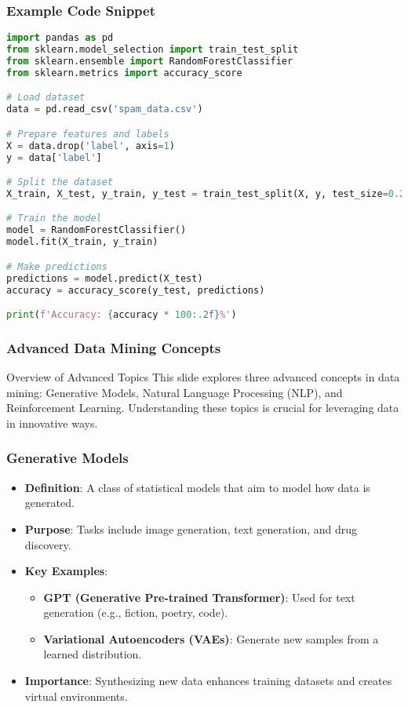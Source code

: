 \documentclass[aspectratio=169]{beamer}
\begin{document}
\begin{frame}[fragile]
    \frametitle{Example Code Snippet}
    \begin{lstlisting}[language=Python]
import pandas as pd
from sklearn.model_selection import train_test_split
from sklearn.ensemble import RandomForestClassifier
from sklearn.metrics import accuracy_score

# Load dataset
data = pd.read_csv('spam_data.csv')

# Prepare features and labels
X = data.drop('label', axis=1)
y = data['label']

# Split the dataset
X_train, X_test, y_train, y_test = train_test_split(X, y, test_size=0.2)

# Train the model
model = RandomForestClassifier()
model.fit(X_train, y_train)

# Make predictions
predictions = model.predict(X_test)
accuracy = accuracy_score(y_test, predictions)

print(f'Accuracy: {accuracy * 100:.2f}%')
    \end{lstlisting}
\end{frame}

\begin{frame}[fragile]
    \frametitle{Advanced Data Mining Concepts}
    \begin{block}{Overview of Advanced Topics}
        This slide explores three advanced concepts in data mining: 
        Generative Models, Natural Language Processing (NLP), and Reinforcement Learning.
        Understanding these topics is crucial for leveraging data in innovative ways.
    \end{block}
\end{frame}

\begin{frame}[fragile]
    \frametitle{Generative Models}
    \begin{itemize}
        \item \textbf{Definition}: A class of statistical models that aim to model how data is generated.
        \item \textbf{Purpose}: Tasks include image generation, text generation, and drug discovery.
        \item \textbf{Key Examples}:
            \begin{itemize}
                \item \textbf{GPT (Generative Pre-trained Transformer)}: Used for text generation (e.g., fiction, poetry, code).
                \item \textbf{Variational Autoencoders (VAEs)}: Generate new samples from a learned distribution.
            \end{itemize}
        \item \textbf{Importance}: Synthesizing new data enhances training datasets and creates virtual environments.
    \end{itemize}
\end{frame}
\end{document}
